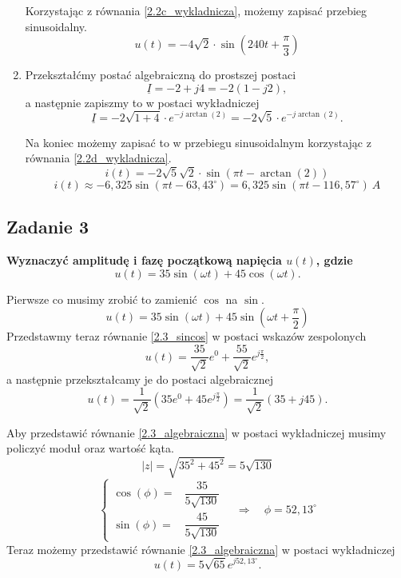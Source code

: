 \documentclass[12pt, a4paper]{article}
\begin{document}
\begin{enumerate}[label=\alph*)]
        Korzystając z równania \ref{2.2c_wykladnicza}, możemy zapisać przebieg
        sinusoidalny.
        $$
          u(t) = -4\sqrt{2}\cdot\sin\left(240t+\frac{\pi}{3}\right)
        $$
  \item Przekształćmy postać algebraiczną do prostszej postaci
        $$
          \underline{I} = -2+j4 = -2(1-j2),
        $$
        a następnie zapiszmy to w postaci wykładniczej
        \begin{equation}\label{2.2d_wykladnicza}
          \underline{I} = -2\sqrt{1+4}\cdot e^{-j\arctan(2)} =
          -2\sqrt{5}\cdot e^{-j\arctan(2)}.
        \end{equation}

        Na koniec możemy zapisać to w przebiegu sinusoidalnym korzystając z
        równania \ref{2.2d_wykladnicza}.
        $$
          i(t) = -2\sqrt{5}\sqrt{2}\cdot \sin\left(\pi t-\arctan(2)\right)
        $$
        $$
          i(t) \approx -6,325\sin\left(\pi t-63,43^\circ\right) =
          6,325\sin\left(\pi t-116,57^\circ\right)\: A
        $$
\end{enumerate}

\subsection{Zadanie 3}
\textbf{Wyznaczyć amplitudę i fazę początkową napięcia $u(t)$, gdzie}
$$
  u(t) = 35\sin(\omega t)+45\cos(\omega t).
$$

Pierwsze co musimy zrobić to zamienić $\cos$ na $\sin$.
\begin{equation}\label{2.3_sincos}
  u(t) = 35\sin(\omega t)+45\sin(\omega t+\frac{\pi}{2})
\end{equation}
Przedstawmy teraz równanie \ref{2.3_sincos} w postaci wskazów zespolonych
$$
  u(t) = \frac{35}{\sqrt{2}}e^{0}+\frac{55}{\sqrt{2}}e^{j\frac{\pi}{2}},
$$
a następnie przekształcamy je do postaci algebraicznej
\begin{equation}\label{2.3_algebraiczna}
  u(t) = \frac{1}{\sqrt{2}}\left(35e^0+45e^{j\frac{\pi}{2}}\right) =
  \frac{1}{\sqrt{2}}\left(35+j45\right).
\end{equation}

Aby przedstawić równanie \ref{2.3_algebraiczna} w postaci wykładniczej musimy
policzyć moduł oraz wartość kąta.
$$
  |z| = \sqrt{35^2+45^2} = 5\sqrt{130}
$$
$$
  \left\{
  \begin{array}{rl}
    \cos(\phi) = & \dfrac{35}{5\sqrt{130}} \\
    \sin(\phi) = & \dfrac{45}{5\sqrt{130}}
  \end{array}
  \right.
  \quad \Rightarrow \quad \phi = 52,13^\circ
$$
Teraz możemy przedstawić równanie \ref{2.3_algebraiczna} w postaci wykładniczej
\begin{equation}\label{2.3_wykładnicza}
  u(t) = 5\sqrt{65}e^{j52,13^\circ}.
\end{equation}
\end{document}
